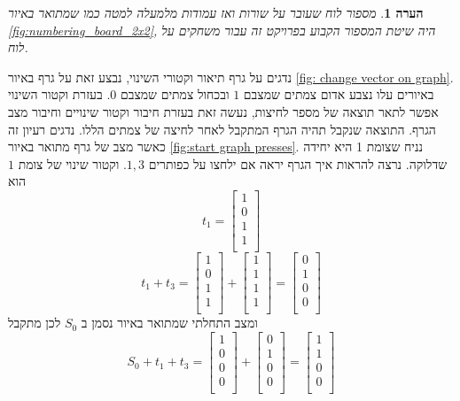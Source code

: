 \documentclass[12pt,leqno]{article}
\theoremstyle{theoremdd}
\newtheorem{comm}{הערה}
\begin{document}
\begin{comm}
    \label{ comm: indexing board game}
    מספור לוח שעובר על שורות ואז עמודות מלמעלה למטה כמו שמתואר באיור
    \ref{fig:numbering_board_2x2},
     היה שיטת המספור הקבוע בפרויקט זה עבור משחקים על לוח.
\end{comm}
נדגים על גרף תיאור וקטורי השינוי,
נבצע זאת על גרף באיור
\ref{fig: change vector on graph}.
באיורים עלו נצבע אדום צמתים שמצבם  
$1$
ובכחול 
צמתים שמצבם 
$0$.
בעזרת וקטור השינוי אפשר לתאר תוצאה של מספר לחיצות,
נעשה זאת בעזרת חיבור וקטור שינויים
וחיבור מצב הגרף.
התוצאה שנקבל 
תהיה הגרף המתקבל לאחר לחיצה של צמתים
הללו.
נדגים רעיון זה כאשר מצב של גרף מתואר באיור
\ref{fig:start graph presses}.
נניח שצומת 1 היא יחידה שדלוקה.
נרצה להראות איך הגרף יראה אם ילחצו על כפותרים 
$1, 3$.
וקטור שינוי של צומת 
$1$
הוא
\[
    t_1 = 
    \begin{bmatrix}
        1 \\
        0 \\
        1 \\
        1 \\
    \end{bmatrix}
\]
\[
    t_1 + t_3 = 
    \begin{bmatrix}
        1 \\
        0 \\
        1 \\
        1 \\
    \end{bmatrix}
    +
    \begin{bmatrix}
        1 \\
        1 \\
        1 \\
        1 \\
    \end{bmatrix}
    =
    \begin{bmatrix}
        0 \\
        1 \\
        0 \\
        0 \\
    \end{bmatrix}
\]
ומצב התחלתי שמתואר באיור נסמן ב
$S_0$
לכן מתקבל
\[
    S_0 + t_1 + t_3 = 
    \begin{bmatrix}
        1 \\
        0 \\
        0 \\
        0 \\
    \end{bmatrix}
    +
    \begin{bmatrix}
        0 \\
        1 \\
        0 \\
        0 \\
    \end{bmatrix}
    =
    \begin{bmatrix}
        1 \\
        1 \\
        0 \\
        0 \\
    \end{bmatrix}
\]
\end{document}

